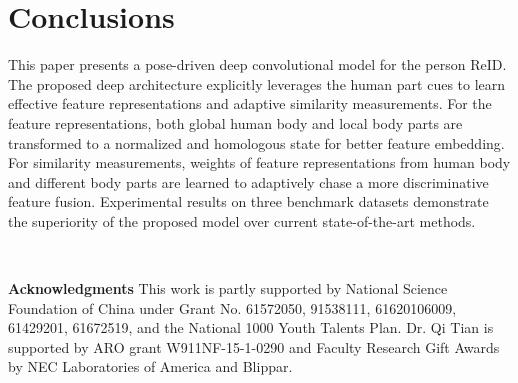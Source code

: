 \documentclass[10pt,twocolumn,letterpaper]{article}
\begin{document}
\section{Conclusions}
\label{sec_conclusion}
This paper presents a pose-driven deep convolutional model for the person ReID. The proposed deep architecture explicitly leverages the human part cues to learn effective feature representations and adaptive similarity measurements. For the feature representations, both global human body and local body parts are transformed to a normalized and homologous state for better feature embedding. For similarity measurements, weights of feature representations from human body and different body parts are learned to adaptively chase a more discriminative feature fusion. Experimental results on three benchmark datasets demonstrate the superiority of the proposed model over current state-of-the-art methods.

~\\
\begin{small}
\textbf{Acknowledgments}
This work is partly supported by National Science Foundation of China under Grant No. 61572050, 91538111, 61620106009, 61429201, 61672519, and the National 1000 Youth Talents Plan. Dr. Qi Tian is supported by ARO grant W911NF-15-1-0290 and Faculty Research Gift Awards by NEC Laboratories of America and Blippar.
\end{small}




{\small


}
\end{document}
